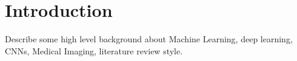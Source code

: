 \chapter{Introduction}

Describe some high level background about Machine Learning, deep learning, CNNs, Medical Imaging, literature review style.